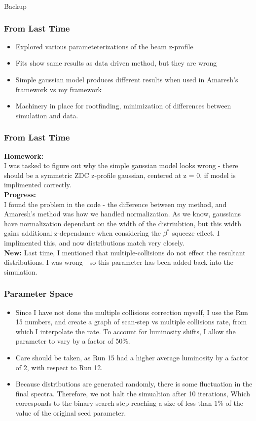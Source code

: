 \begin{frame}
  \begin{center}
    \Huge Backup
  \end{center}
\end{frame}

\begin{frame}
\frametitle{From Last Time}
\begin{itemize}
	\item Explored various parameteterizations of the beam z-profile
	\item Fits show same results as data driven method, but they are wrong
	\item Simple gaussian model produces different results when used in Amaresh's
		framework vs my framework
	\item Machinery in place for rootfinding, minimization of differences between
		simulation and data.
\end{itemize}
\end{frame}
\begin{frame}
\frametitle{From Last Time}

\textbf{Homework:} \\
I was tasked to figure out why the simple gaussian model looks wrong - there
should be a symmetric ZDC z-profile gaussian, centered at z = 0, if model is
implimented correctly.\\
\textbf{Progress:} \\
I found the problem in the code - the difference between my method, and
Amaresh's method was how we handled normalization. As we know, gaussians have
normalization dependant on the width of the distriubtion, but this width gains
additional z-dependance when considering the $\beta^*$ squeeze effect. I
implimented this, and now distributions match very closely.\\
\textbf{New:}
Last time, I mentioned that multiple-collisions do not effect the resultant
distributions. I was wrong - so this parameter has been added back into the
simulation.
\end{frame}

\begin{frame}
	\frametitle{Parameter Space}
	\begin{itemize}
		\item Since I have not done the multiple collisions correction myself, I
			use the Run 15 numbers, and create a graph of scan-step vs multiple
			collisions rate, from which I interpolate the rate. To account for
			luminosity shifts, I allow the parameter to vary by a factor of 50\%.
		\item Care should be taken, as Run 15 had a higher average luminosity by a
			factor of 2, with respect to Run 12.
		\item Because distributions are generated randomly, there is some
			fluctuation in the final spectra. Therefore, we not halt the simualtion
			after 10 iterations, Which corresponds to the binary search step reaching
			a size of less than 1\% of the value of the original seed parameter.
	\end{itemize}
\end{frame}


